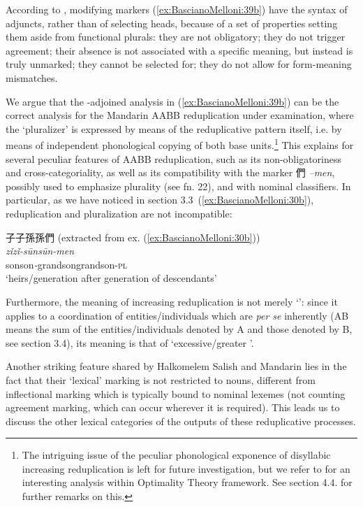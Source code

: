 \documentclass[output=paper]{langsci/langscibook}
\begin{document}
According to %
\citet[688]{Wiltschko2008}%
%
, modifying  markers (\ref{ex:BascianoMelloni:39b}) have
the syntax of adjuncts, rather than of selecting heads, because of a set
of properties setting them aside from functional plurals: they are not
obligatory; they do not trigger agreement; their absence is not
associated with a specific meaning, but instead is truly unmarked; they
cannot be selected for; they do not allow for form-meaning mismatches.

We argue that the -adjoined analysis in (\ref{ex:BascianoMelloni:39b}) can be the correct
analysis for the Mandarin AABB reduplication under examination, where
the `pluralizer' is expressed by means of the reduplicative pattern
itself, i.e. by means of independent phonological copying of both base
units.\footnote{The intriguing issue of the peculiar phonological
  exponence of disyllabic increasing reduplication is left for future
  investigation, but we refer to %
\citet{Feng2003} %
%
for an interesting analysis
  within Optimality Theory framework. See section 4.4. for further
  remarks on this.} This explains for several peculiar features of AABB
reduplication, such as its non-obligatoriness and cross-categoriality,
as well as its compatibility with the  marker 們 \emph{--men},
possibly used to emphasize plurality (see fn. 22), and with nominal
classifiers. In particular, as we have noticed in section 3.3~(\ref{ex:BascianoMelloni:30b}),
reduplication and pluralization are not incompatible:

\ea\label{ex:BascianoMelloni:40}子子孫孫們 (extracted from ex. (\ref{ex:BascianoMelloni:30b}))\\
\gll  \emph{zǐ\tld{}zǐ-sūn\tld{}sūn-men }\\
son\emph{\tld{}}son\emph{-}grandson\emph{\tld{}}grandson-\textsc{pl}\\
\glt `heirs/generation after generation of descendants'
\z


Furthermore, the  meaning of increasing reduplication is not
merely `': since it applies to a coordination of
entities/individuals which are \emph{per se} inherently  (AB means
the sum of the entities/individuals denoted by A and those denoted by B,
see section 3.4), its meaning is that of `excessive/greater '.

Another striking feature shared by Halkomelem Salish and Mandarin lies
in the fact that their `lexical'  marking is not restricted to
nouns, different from inflectional  marking which is typically
bound to nominal lexemes (not counting agreement  marking, which
can occur wherever it is required). This leads us to discuss the other
lexical categories of the outputs of these reduplicative processes.
\end{document}
